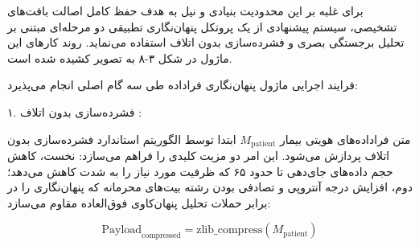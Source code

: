 

برای غلبه بر این محدودیت بنیادی و نیل به هدف حفظ کامل اصالت بافت‌های تشخیصی، سیستم پیشنهادی از یک پروتکل پنهان‌نگاری تطبیقی دو مرحله‌ای مبتنی بر تحلیل برجستگی بصری  و فشرده‌سازی بدون اتلاف  استفاده می‌نماید. روند کارهای این ماژول در شکل ۳{-}۸ به تصویر کشیده شده است.\par






فرایند اجرایی ماژول پنهان‌نگاری فراداده طی سه گام اصلی انجام می‌پذیرد:\par



۱. فشرده‌سازی بدون اتلاف  :\par

متن فراداده‌های هویتی بیمار $M_{\mathrm{patient}}$ ابتدا توسط الگوریتم استاندارد فشرده‌سازی بدون اتلاف  پردازش می‌شود. این امر دو مزیت کلیدی را فراهم می‌سازد: نخست، کاهش حجم داده‌های جای‌دهی تا حدود ۶۵ که ظرفیت مورد نیاز را به شدت کاهش می‌دهد؛ دوم، افزایش درجه آنتروپی و تصادفی بودن رشته بیت‌های محرمانه که پنهان‌نگاری را در برابر حملات تحلیل پنهان‌کاوی  فوق‌العاده مقاوم می‌سازد:\par



\[\mathrm{Payload}_{\mathrm{compressed}} = \mathrm{zlib\_compress}(M_{\mathrm{patient}})\]\par

